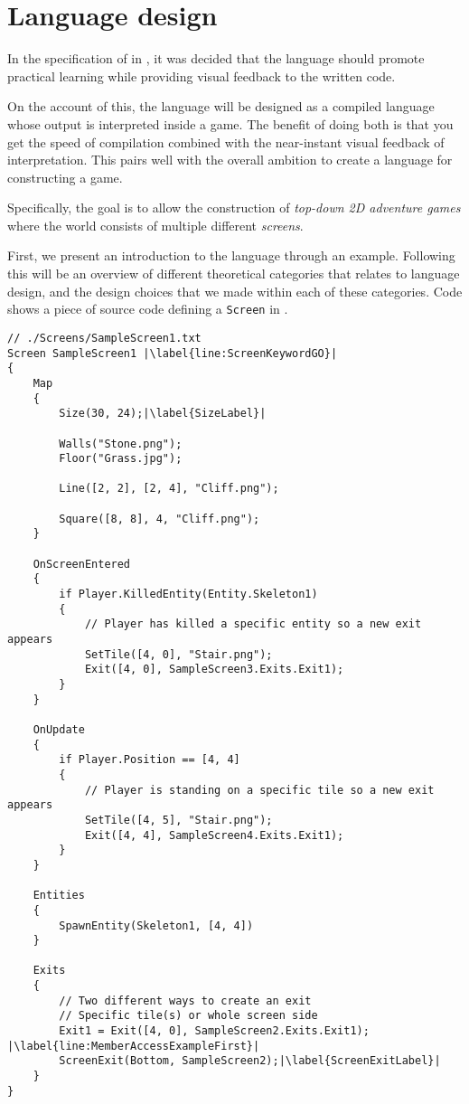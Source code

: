 \chapter{Language design}\label{chap:language_design}
In the specification of \dazel{} in , it was decided that the language should promote practical learning while providing visual feedback to the written code. 

On the account of this, the \dazel{} language will be designed as a compiled language whose output is interpreted inside a game.
The benefit of doing both is that you get the speed of compilation combined with the near-instant visual feedback of interpretation.
This pairs well with the overall ambition to create a language for constructing a game.

Specifically, the goal is to allow the construction of \textit{top-down 2D adventure games} where the world consists of multiple different \textit{screens}.

First, we present an introduction to the \dazel{} language through an example.
Following this will be an overview of different theoretical categories that relates to language design, and the design choices that we made within each of these categories.
Code  shows a piece of source code defining a \texttt{Screen} in \dazel{}. 

\begin{lstlisting}[language=CSharp, caption={Example screen.}, label={lst:SampleScreen1},escapechar=|]
// ./Screens/SampleScreen1.txt
Screen SampleScreen1 |\label{line:ScreenKeywordGO}|
{
    Map 
    {
        Size(30, 24);|\label{SizeLabel}|

        Walls("Stone.png"); 
        Floor("Grass.jpg");

        Line([2, 2], [2, 4], "Cliff.png");

        Square([8, 8], 4, "Cliff.png");
    }

    OnScreenEntered
    {
        if Player.KilledEntity(Entity.Skeleton1) 
        {
            // Player has killed a specific entity so a new exit appears
            SetTile([4, 0], "Stair.png");
            Exit([4, 0], SampleScreen3.Exits.Exit1);
        }
    }

    OnUpdate
    {
        if Player.Position == [4, 4] 
        {
            // Player is standing on a specific tile so a new exit appears
            SetTile([4, 5], "Stair.png");
            Exit([4, 4], SampleScreen4.Exits.Exit1);
        }
    }

    Entities
    {
        SpawnEntity(Skeleton1, [4, 4])
    }
    
    Exits 
    {
        // Two different ways to create an exit
        // Specific tile(s) or whole screen side
        Exit1 = Exit([4, 0], SampleScreen2.Exits.Exit1); |\label{line:MemberAccessExampleFirst}|
        ScreenExit(Bottom, SampleScreen2);|\label{ScreenExitLabel}|
    }
}
\end{lstlisting}


